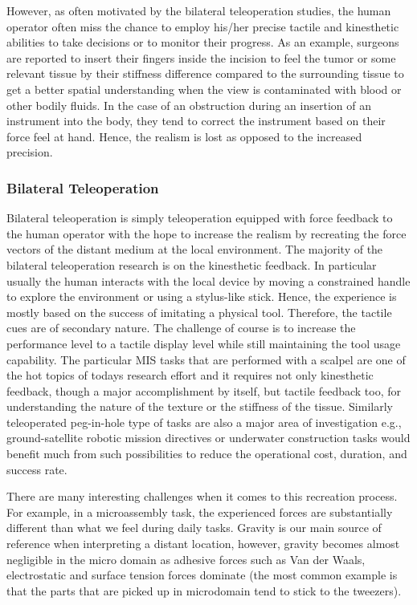 However, as often motivated by the bilateral teleoperation studies, the human operator often miss the chance to employ his/her precise tactile and kinesthetic abilities to take decisions or to monitor their progress. As an example, surgeons are reported to insert their fingers inside the incision to feel the tumor or some relevant tissue by their stiffness difference compared to the surrounding tissue to get a better spatial understanding when the view is contaminated with blood or other bodily fluids. In the case of an obstruction during an insertion of an instrument into the body, they tend to correct the instrument based on their force feel at hand. Hence, the realism is lost as opposed to the increased precision. 

\subsubsection{Bilateral Teleoperation}

Bilateral teleoperation is simply teleoperation equipped with force feedback to the human operator with the hope to increase the realism by recreating the force vectors of the distant medium at the local environment. The majority of the bilateral teleoperation research is on the kinesthetic feedback. In particular usually the human interacts with the local device by moving a constrained handle to explore the environment or using a stylus-like stick. Hence, the experience is mostly based on the success of imitating a physical tool. Therefore, the tactile cues are of secondary nature. The challenge of course is to increase the performance level to a tactile display level while still maintaining the tool usage capability. The particular MIS tasks that are performed with a scalpel are one of the hot topics of todays research effort and it requires not only kinesthetic feedback, though a major accomplishment by itself, but tactile feedback too, for understanding the nature of the texture or the stiffness of the tissue. Similarly teleoperated peg-in-hole type of tasks are also a major area of investigation e.g., ground-satellite robotic mission directives or underwater construction tasks would benefit much from such possibilities to reduce the operational cost, duration, and success rate. 



There are many interesting challenges when it comes to this recreation process. For example, in a microassembly task, the experienced forces are substantially different than what we feel during daily tasks. Gravity is our main source of reference when interpreting a distant location, however, gravity becomes almost negligible in the micro domain as adhesive forces such as Van der Waals, electrostatic and surface tension forces dominate (the most common example is that the parts that are picked up in microdomain tend to stick to the tweezers). 

